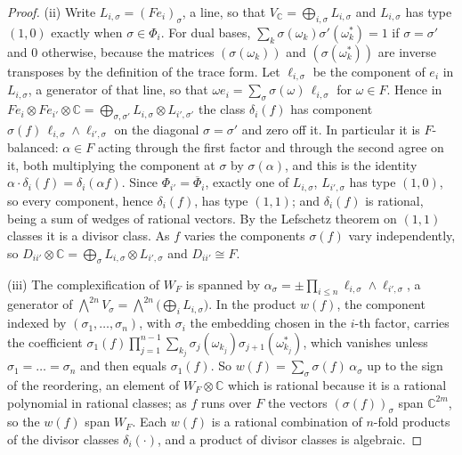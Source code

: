\documentclass[11pt,reqno]{amsart}
\theoremstyle{plain}
\theoremstyle{definition}
\theoremstyle{remark}
\newcommand{\CC}{\mathbb{C}}
\newcommand{\bbar}[1]{\overline{#1}}
\begin{document}
\begin{proof}
(ii) Write $L_{i,\sigma}=(Fe_{i})_{\sigma}$, a line, so that
$V_{\CC}=\bigoplus_{i,\sigma}L_{i,\sigma}$ and $L_{i,\sigma}$ has type $(1,0)$
exactly when $\sigma\in\Phi_{i}$. For dual bases,
$\sum_{k}\sigma(\omega_{k})\sigma'(\omega_{k}^{*})=1$ if $\sigma=\sigma'$ and
$0$ otherwise, because the matrices $(\sigma(\omega_{k}))$ and
$(\sigma(\omega_{k}^{*}))$ are inverse transposes by the definition of the
trace form. Let $\ell_{i,\sigma}$ be the component of $e_{i}$ in
$L_{i,\sigma}$, a generator of that line, so that
$\omega e_{i}=\sum_{\sigma}\sigma(\omega)\,\ell_{i,\sigma}$ for $\omega\in F$.
Hence in $Fe_{i}\otimes Fe_{i'}\otimes\CC
=\bigoplus_{\sigma,\sigma'}L_{i,\sigma}\otimes L_{i',\sigma'}$ the class
$\delta_{i}(f)$ has component $\sigma(f)\,\ell_{i,\sigma}\wedge\ell_{i',\sigma}$
on the diagonal $\sigma=\sigma'$ and zero off it. In particular it is
$F$-balanced: $\alpha\in F$ acting through the first factor and through the
second agree on it, both multiplying the component at $\sigma$ by
$\sigma(\alpha)$, and this is the identity
$\alpha\cdot\delta_{i}(f)=\delta_{i}(\alpha f)$. Since $\Phi_{i'}=\bbar\Phi_{i}$,
exactly one of $L_{i,\sigma}$, $L_{i',\sigma}$ has type $(1,0)$, so every
component, hence $\delta_{i}(f)$, has type $(1,1)$; and $\delta_{i}(f)$ is
rational, being a sum of wedges of rational vectors. By the Lefschetz theorem
on $(1,1)$ classes it is a divisor class. As $f$ varies the components
$\sigma(f)$ vary independently, so $D_{ii'}\otimes\CC=\bigoplus_{\sigma}
L_{i,\sigma}\otimes L_{i',\sigma}$ and $D_{ii'}\cong F$.

(iii) The complexification of $W_{F}$ is spanned by
$\alpha_{\sigma}=\pm\prod_{i\le n}\ell_{i,\sigma}\wedge\ell_{i',\sigma}$, a
generator of $\bigwedge^{2n}V_{\sigma}=\bigwedge^{2n}\bigl(\bigoplus_{i}L_{i,\sigma}\bigr)$.
In the product $w(f)$, the component indexed by $(\sigma_{1},\dots,\sigma_{n})$,
with $\sigma_{i}$ the embedding chosen in the $i$-th factor, carries the
coefficient
$\sigma_{1}(f)\prod_{j=1}^{n-1}\sum_{k_{j}}\sigma_{j}(\omega_{k_{j}})\sigma_{j+1}(\omega_{k_{j}}^{*})$,
which vanishes unless $\sigma_{1}=\dots=\sigma_{n}$ and then equals
$\sigma_{1}(f)$. So $w(f)=\sum_{\sigma}\sigma(f)\,\alpha_{\sigma}$ up to the
sign of the reordering, an element of $W_{F}\otimes\CC$ which is rational
because it is a rational polynomial in rational classes; as $f$ runs over
$F$ the vectors $(\sigma(f))_{\sigma}$ span $\CC^{2m}$, so the $w(f)$ span
$W_{F}$. Each $w(f)$ is a rational combination of $n$-fold products of the
divisor classes $\delta_{i}(\cdot)$, and a product of divisor classes is
algebraic.
\end{proof}
\end{document}
